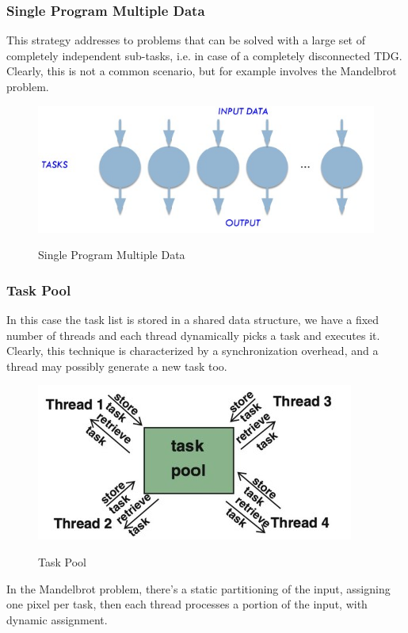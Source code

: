 \subsubsection{Single Program Multiple Data}
This strategy addresses to problems that can be solved with a large set of completely independent sub-tasks, i.e. in case of a completely disconnected TDG. Clearly, this is not a common scenario, but for example involves the Mandelbrot problem.

\begin{figure}[h!]
		\centering
		\includegraphics[scale = 1.5]{img/SPMD.jpg}
        \label{spmd}
        \caption{Single Program Multiple Data}
\end{figure}

\subsubsection{Task Pool}
In this case the task list is stored in a shared data structure, we have a fixed number of threads and each thread dynamically picks a task and executes it. Clearly, this technique is characterized by a synchronization overhead, and a thread may possibly generate a new task too.

\begin{figure}[h!]
		\centering
		\includegraphics[scale = 1.7]{img/task pool.jpg}
        \label{task pool}
        \caption{Task Pool}
\end{figure}

In the Mandelbrot problem, there's a static partitioning of the input, assigning one pixel per task, then each thread processes a portion of the input, with dynamic assignment.

